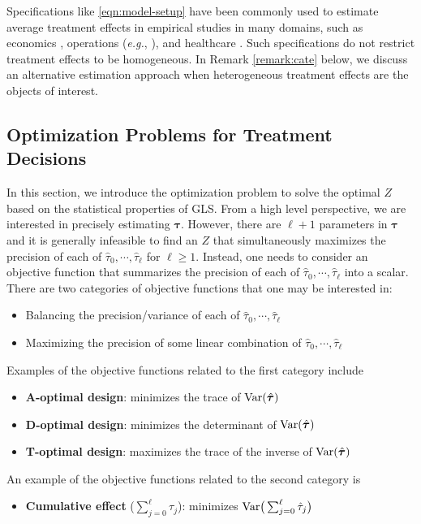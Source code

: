 	
	    \begin{remark}\label{rem:hetreogeneous}
    Specifications like \eqref{eqn:model-setup} have been commonly used to estimate average treatment effects in empirical studies in many domains, such as economics \citep{card1994minimum}, operations ({\it e.g.}, \cite{cui2019learning,cachon2019does}),
    and healthcare \citep{abaluck2021impact}. Such specifications do not restrict treatment effects to be homogeneous. In Remark \ref{remark:cate} below, we discuss an alternative estimation approach when heterogeneous treatment effects are the objects of interest.
	\end{remark}
	

 \subsection{Optimization Problems for Treatment Decisions}\label{subsec:objective}
	
	In this section, we introduce the optimization problem to solve the optimal $Z$ based on the statistical properties of GLS. From a high level perspective, we are interested in precisely estimating $\bm{\tau}$. However, there are $\ell+1$ parameters in $\bm{\tau}$ and it is generally infeasible to find an $Z$ that simultaneously maximizes the precision of each of $\hat{\tau}_0, \cdots, \hat{\tau}_{\ell}$ for $\ell \geq 1$. Instead, one needs to consider an objective function that summarizes the precision of each of $\hat{\tau}_0, \cdots, \hat{\tau}_{\ell}$ into a scalar. There are two categories of objective functions that one may be interested in:
	\begin{itemize}
	    \item Balancing the precision/variance of each of $\hat{\tau}_0, \cdots, \hat{\tau}_{\ell}$
	    \item Maximizing the precision of some linear combination of $\hat{\tau}_0, \cdots, \hat{\tau}_{\ell}$
	\end{itemize}
	Examples of the objective functions related to the first category include \citep{atkinson2007optimum} 
	\begin{itemize}
	    \item \textbf{A-optimal design}: minimizes the trace of $\mathrm{Var}(\hat{\bm{\tau}})$
	    \item \textbf{D-optimal design}: minimizes the determinant of $\mathrm{Var}(\hat{\bm{\tau}})$
	    \item \textbf{T-optimal design}: maximizes the trace of the inverse of $\mathrm{Var}(\hat{\bm{\tau}})$
	\end{itemize}
	An example of the objective functions related to the second category is
\begin{itemize}
    \item \textbf{Cumulative effect} ($\sum_{j=0}^\ell \tau_j$): minimizes $\mathrm{Var}\big(\sum_{j = 0}^\ell \hat{\tau}_j\big)$
\end{itemize}


